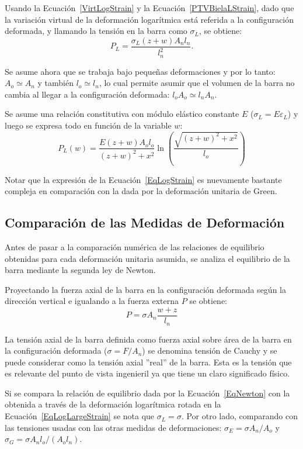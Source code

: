 Usando la Ecuación~\eqref{VirtLogStrain} y la Ecuación~\eqref{PTVBielaLStrain}, dado que la variación virtual de la deformación logarítmica está referida a la configuración deformada, y llamando la tensión en la barra como $\sigma_L$, se obtiene:
%
\begin{equation}\label{EqLogLargeStrain}
P_L = \frac{\sigma_L(z+w)A_nl_n}{l_n^2}.
\end{equation}

Se asume ahora que se trabaja bajo pequeñas deformaciones y por lo tanto: $A_o \simeq A_n$ y también $l_o \simeq l_n$, lo cual permite asumir que el volumen de la barra no cambia al llegar a la configuración deformada: $l_o A_o \simeq l_n A_n$. 

Se asume una relación constitutiva con módulo elástico constante $E$ ($\sigma_L = E \varepsilon_L$) y luego se expresa todo en función de la variable $w$:
%
\begin{equation}\label{EqLogStrain}
	\boxed{
P_L(w) = \frac{E(z+w)A_ol_o}{(z+w)^2+x^2}\ln\left(\frac{\sqrt{(z+w)^2+x^2}}{l_o}\right)
}
\end{equation}

Notar que la expresión de la Ecuación~\eqref{EqLogStrain} es nuevamente bastante compleja en comparación con la dada por la deformación unitaria de Green.

\subsection{Comparación de las Medidas de Deformación}

Antes de pasar a la comparación numérica de las relaciones de equilibrio obtenidas para cada deformación unitaria asumida, se analiza el equilibrio de la barra mediante la segunda ley de Newton.

Proyectando la fuerza axial de la barra en la configuración deformada según la dirección vertical e igualando a la fuerza externa $P$ se obtiene:
%
\begin{equation}\label{EqNewton}
P = \sigma A_n \frac{w+z}{l_n}
\end{equation}

La tensión axial de la barra definida como fuerza axial sobre área de la barra en la configuración deformada ($\sigma = F / A_n$) se denomina tensión de Cauchy y se puede considerar como la tensión axial ''real'' de la barra. Esta es la tensión que es relevante del punto de vista ingenieril ya que tiene un claro significado físico.

Si se compara la relación de equilibrio dada por la Ecuación~\eqref{EqNewton} con la obtenida a través de la deformación logarítmica rotada en la Ecuación~\eqref{EqLogLargeStrain} se nota que $\sigma_L=\sigma$. %
%
Por otro lado, comparando con las tensiones usadas con las otras medidas de deformaciones: $\sigma_E = \sigma A_n / A_o$ y $\sigma_G = \sigma A_nl_o/(A_ol_n)$.

